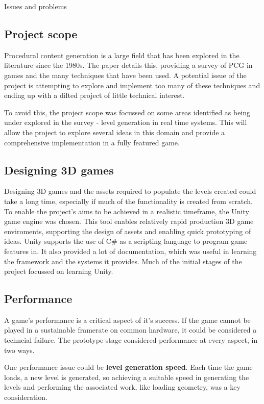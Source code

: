 \documentclass[progress]{cmpreport}
\begin{document}
\begin{section}{Issues and problems}

\subsection{Project scope}
Procedural content generation is a large field that has been explored in the literature since the 1980s. The paper \cite{Hendrikx:2013:PCG:2422956.2422957} details this, providing a survey of PCG in games and the many techniques that have been used. A potential issue of the project is attempting to explore and implement too many of these techniques and ending up with a dilted project of little technical interest. 

To avoid this, the project scope was focussed on some areas identified as being under explored in the survey - level generation in real time systems. This will allow the project to explore several ideas in this domain and provide a comprehensive implementation in a fully featured game.

\subsection{Designing 3D games}
Designing 3D games and the assets required to populate the levels created could take a long time, especially if much of the functionality is created from scratch. To enable the project's aims to be achieved in a realistic timeframe, the Unity game engine was chosen. This tool enables relatively rapid production 3D game enviroments, supporting the design of assets and enabling quick prototyping of ideas. Unity supports the use of C\# as a scripting language to program game features in. It also provided a lot of documentation, which was useful in learning the framework and the systems it provides. Much of the initial stages of the project focussed on learning Unity.

\subsection{Performance}
A game's performance is a critical aspect of it's success. If the game cannot be played in a sustainable framerate on common hardware, it could be considered a techncial failure. The prototype stage considered performance at every aspect, in two ways.

One performance issue could be \textbf{level generation speed}. Each time the game loads, a new level is generated, so achieving a suitable speed in generating the levels and performing the associated work, like loading geometry, was a key consideration.


\end{section}
\end{document}
